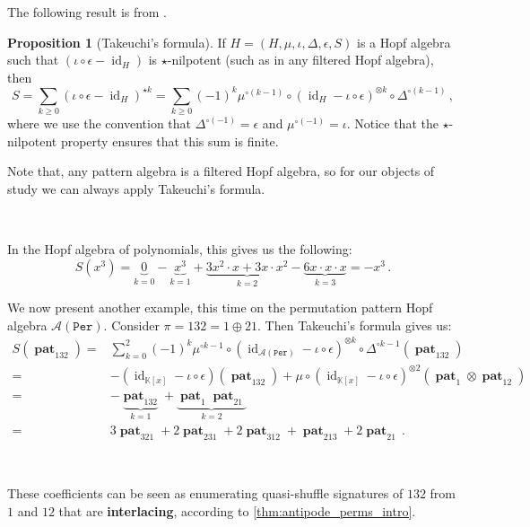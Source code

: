 \documentclass[12pt, reqno]{amsart}
\theoremstyle{definition}
\newtheorem{prop}[thm]{Proposition}
\DeclareMathOperator{\id}{id}
\DeclareMathOperator{\pat}{\mathbf{pat}}
\begin{document}
The following result is from \cite[Lemma 14]{Takeuchi1971}.

\begin{prop}[Takeuchi's formula]\label{lm:takeuchi}
If $H = (H, \mu, \iota, \Delta, \epsilon, S)$ is a Hopf algebra such that $(\iota\circ \epsilon - \id_H)$ is $\star$-nilpotent (such as in any filtered Hopf algebra), then 
\begin{equation}\label{eq:eq1}
S = \sum_{k\geq 0 }  ( \iota  \circ\epsilon- \id_H)^{\star k} = \sum_{k\geq 0} (-1)^k \mu^{\circ (k-1)} \circ (\id_{H} - \iota \circ \epsilon)^{\otimes k} \circ \Delta^{\circ (k-1)}\, ,
\end{equation}
where we use the convention that $\Delta^{\circ (-1)} = \epsilon $ and $\mu^{\circ (-1)} = \iota$.
Notice that the $\star$-nilpotent property ensures that this sum is finite.
\end{prop}

Note that, any pattern algebra is a filtered Hopf algebra, so for our objects of study we can always apply Takeuchi's formula.

\

In the Hopf algebra of polynomials, this gives us the following:
$$S(x^3) = \underbrace{0}_{k = 0} - \underbrace{x^3}_{k = 1} + \underbrace{3 x^2 \cdot x + 3 x \cdot x^2}_{k=2} - \underbrace{6 x \cdot x \cdot x}_{k = 3} = - x^3 \, .$$


We now present another example, this time on the permutation pattern Hopf algebra $\mathcal A(\mathtt{Per})$.
Consider $\pi = 132 = 1 \oplus 21$. Then Takeuchi's formula gives us:
\begin{align*}
S(\pat_{132}) =& \sum_{k=0}^2 (-1)^k \mu^{\circ k-1} \circ (\id_{\mathcal A(\mathtt{Per})} - \iota \circ \epsilon)^{\otimes k} \circ \Delta^{\circ k-1}(\pat_{132})\\
=& -(\id_{\mathbb{K}[x]} - \iota \circ \epsilon)(\pat_{132}) + \mu \circ (\id_{\mathbb{K}[x]} - \iota\circ\epsilon)^{\otimes 2}(\pat_1 \otimes \pat_{12}) \\
=& - \underbrace{\pat_{132}}_{k=1} + \underbrace{\pat_1 \pat_{21}}_{k=2} \\
=& 3 \pat_{321} + 2 \pat_{231} + 2 \pat_{312} + \pat_{213} + 2 \pat_{21} \, .
\end{align*}

\

These coefficients can be seen as enumerating quasi-shuffle signatures of $132$ from $1$ and $12$ that are \textbf{interlacing}, according to \cref{thm:antipode_perms_intro}.
\end{document}
